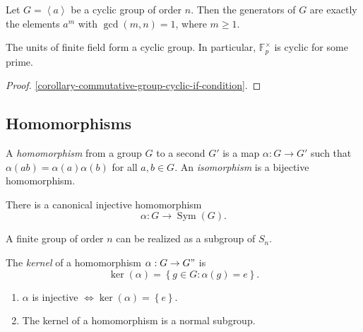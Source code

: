 \begin{proposition}
  \label{proposition-generator-of-cyclic-group}
  Let \( G = \left\langle a \right\rangle \) be a cyclic group of order \( n \).
  Then the generators of \( G \) are exactly the elements \( a^m \) with \( \gcd(m, n) = 1 \), where \( m \geq 1 \).
\end{proposition}

\begin{example}
  \label{example-units-of-finite-field-cyclic}
  The units of finite field form a cyclic group.
  In particular, \( \mathbb{F}_p^\times \) is cyclic for some prime.
\end{example}
\begin{proof}
  \ref{corollary-commutative-group-cyclic-if-condition}.
\end{proof}

\subsection{Homomorphisms}
\label{subsection-homomorphisms}


\begin{definition}
  \label{definition-homomorphism}
  \label{definition-isomorphism}
  A \emph{homomorphism} from a group \( G \) to a second \( G' \) is a map \( \alpha: G \to G' \) such that \( \alpha(ab) = \alpha(a) \alpha(b) \) for all \( a, b \in G \).
  An \emph{isomorphism} is a bijective homomorphism.
\end{definition}

\begin{theorem}[Cayley]
  \label{theorem-Cayley}
  There is a canonical injective homomorphism
  \[
    \alpha: G \to \operatorname{Sym}(G).
  \]
\end{theorem}
\begin{corollary}
  \label{corollary-realize-finite-group-as-permutation}
  A finite group of order \( n \) can be realized as a subgroup of \( S_n \).
\end{corollary}


\begin{definition}
  \label{definition-kernel}
  The \emph{kernel} of a homomorphism \( \alpha: G\to G" \) is
  \[
    \ker (\alpha) = \left\lbrace g \in G: \alpha(g) = e \right\rbrace.
  \]
\end{definition}

\begin{proposition}
  \label{proposition-kernel-properties}
  \begin{enumerate}
    \item \( \alpha \) is injective \( \iff \ker (\alpha) = \left\lbrace e \right\rbrace \).
    \item The kernel of a homomorphism is a normal subgroup.
  \end{enumerate}
\end{proposition}

